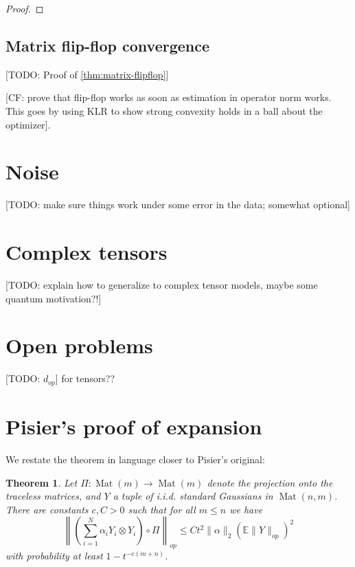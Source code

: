 \documentclass{article}
\newtheorem{theorem}{Theorem}
\newcommand{\mat}{\operatorname{Mat}}
\newcommand{\E}{\mathbb{E}}
\newcommand\samp{x}
\newcommand{\CF}[1]{{\color{purple}[CF: #1]}}
\newcommand{\TODO}[1]{{\color{blue}[TODO: #1]}}
\begin{document}
\begin{proof}

\end{proof}

\subsection{Matrix flip-flop convergence}


\TODO{Proof of \cref{thm:matrix-flipflop}}


\CF{prove that flip-flop works as soon as estimation in operator norm works. This goes by using KLR to show strong convexity holds in a ball about the optimizer}.






\section{Noise}
\TODO{make sure things work under some error in the data; somewhat optional}


\section{Complex tensors}
\TODO{explain how to generalize to complex tensor models, maybe some quantum motivation?!}

\section{Open problems}
\TODO{$d_{op}$} for tensors??








\appendix




\section{Pisier's proof of expansion}\label{sec:pisier}
We restate the theorem in language closer to Pisier's original:

\begin{theorem} \label{thm:Pisier-expansion}
Let $\Pi: \mat(m) \to \mat(m)$ denote the projection onto the traceless matrices, and $Y$ a tuple of i.i.d. standard Gaussians in $\mat(n,m)$. There are constants $c,C > 0$ such that for all $m \leq n$ we have 
\[ \left\| \left(\sum_{i=1}^{N} \alpha_{i} Y_{i} \otimes Y_{i}\right) \circ \Pi \right\|_{op} \leq C t^{2} \|\alpha\|_{2} \left( \E \|Y\|_{op} \right)^{2} \]
with probability at least $ 1- t^{-c(m+n)}$. 
\end{theorem}
\end{document}
